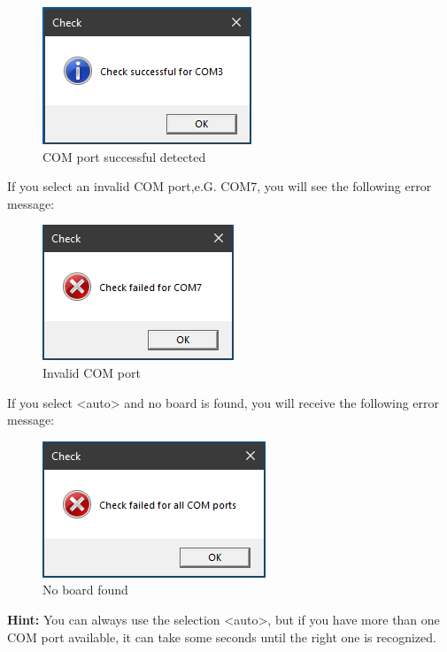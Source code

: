 \documentclass[11pt,a4paper]{article}
\begin{document}
\begin{figure}[H]
	\centering
	\includegraphics[scale=1.0]{MillenniumChessLink3.png}
	\caption{COM port successful detected }
	\label{fig:iChessOne3}
\end{figure}

If you select an invalid COM port,e.G. COM7, you will see the following error message:

\begin{figure}[H]
	\centering
	\includegraphics[scale=1.0]{MillenniumChessLink4.png}
	\caption{Invalid COM port }
	\label{fig:iChessOne4}
\end{figure}

If you select <auto> and no board is found, you will receive the following error message:

\begin{figure}[H]
	\centering
	\includegraphics[scale=1.0]{MillenniumChessLink5.png}
	\caption{No board found }
	\label{fig:iChessOne5}
\end{figure}

\textbf{Hint:} You can always use the selection <auto>, but if you have more than one COM port available, it can take some seconds until the right one is recognized.\\
\end{document}
